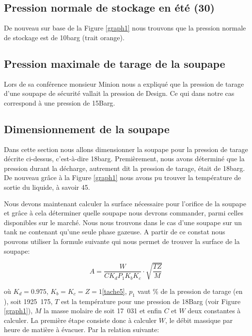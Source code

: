 \subsection{Pression normale de stockage en été (\unit{30}{\celsius})}

De nouveau sur base de la Figure \ref{graph1} nous trouvons que la pression normale de stockage est de \unit{10}{barg} (trait orange).

\subsection{Pression maximale de tarage de la soupape}

Lors de sa conférence monsieur Minion nous a expliqué que la pression de tarage d'une soupape de sécurité vallait la pression de Design. Ce qui dans notre cas correspond à une pression de \unit{15}{Barg}.

\subsection{Dimensionnement de la soupape}

Dans cette section nous allons dimensionner la soupape pour la pression de tarage décrite ci-dessus, c'est-à-dire \unit{18}{barg}.
Premièrement, nous avons déterminé que la pression durant la décharge, autrement dit la pression de tarage, était de \unit{18}{barg}. De nouveau grâce à la Figure \ref{graph1} nous avons pu trouver la température de sortie du liquide, à savoir \unit{45}{\celsius}.

Nous devons maintenant calculer la surface nécessaire pour l'orifice de la soupape et grâce à cela déterminer quelle soupape nous devrons commander, parmi celles disponibles sur le marché. Nous nous trouvons dans le cas d'une soupape sur un tank ne contenant qu'une seule phase gazeuse. A partir de ce constat nous pouvons utiliser la formule suivante qui nous permet de trouver la surface de la soupape:

\begin{equation}
A=\dfrac{W}{CK_dP_1K_bK_c}\cdot \sqrt{\dfrac{TZ}{M}}
\label{1}
\end{equation}

où $K_d=0.975$, $K_b=K_c=Z=1$\ref{tache5}, $p_1$ vaut  \% de la pression de tarage (en \bbar), soit \unit{1925.175}{\kilo \pascal}, $T$ est la température pour une pression de \unit{18}{Barg} (voir Figure \ref{graph1}), $M$ la masse molaire de  soit \unit{17.031}{\gram \per \mole} et enfin $C$ et $W$ deux constantes à calculer. La première étape consiste donc à calculer $W$, le débit massique par heure de matière à évacuer. Par la relation suivante:

